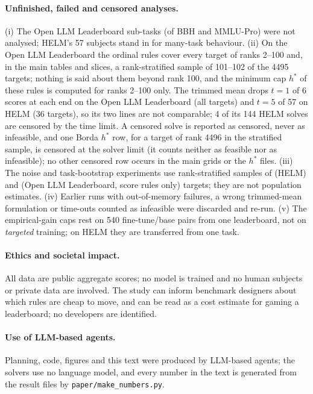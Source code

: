 \paragraph{Unfinished, failed and censored analyses.}
(i) The Open LLM Leaderboard sub-tasks (of BBH and MMLU-Pro) were not analysed; HELM's 57 subjects stand in for many-task behaviour. (ii) On the Open LLM Leaderboard the ordinal rules cover every target of ranks 2--100 and, in the main tables and slices, a rank-stratified sample of 101--102 of the 4495 targets; nothing is said about them beyond rank 100, and the minimum cap $h^\ast$ of these rules is computed for ranks 2--100 only. The trimmed mean drops $t=1$ of 6 scores at each end on the Open LLM Leaderboard (all targets) and $t=5$ of 57 on HELM (36 targets), so its two lines are not comparable; 4 of its 144 HELM solves are censored by the time limit. A censored solve is reported as censored, never as infeasible, and one Borda $h^\ast$ row, for a target of rank 4496 in the stratified sample, is censored at the solver limit (it counts neither as feasible nor as infeasible); no other censored row occurs in the main grids or the $h^\ast$ files. (iii) The noise and task-bootstrap experiments use rank-stratified samples of \noiseNHelm{} (HELM) and \noiseNOllb{} (Open LLM Leaderboard, score rules only) targets; they are not population estimates. (iv) Earlier runs with out-of-memory failures, a wrong trimmed-mean formulation or time-outs counted as infeasible were discarded and re-run. (v) The empirical-gain caps rest on 540 fine-tune/base pairs from one leaderboard, not on \emph{targeted} training; on HELM they are transferred from one task.

\paragraph{Ethics and societal impact.}
All data are public aggregate scores; no model is trained and no human subjects or private data are involved. The study can inform benchmark designers about which rules are cheap to move, and can be read as a cost estimate for gaming a leaderboard; no developers are identified.

\paragraph{Use of LLM-based agents.}
Planning, code, figures and this text were produced by LLM-based agents; the solvers use no language model, and every number in the text is generated from the result files by \texttt{paper/make\_numbers.py}.
